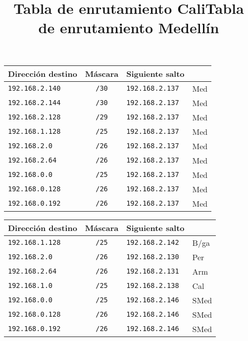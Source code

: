 \begin{table}[h]
\label{enrutamientoCal}
\begin{center}
\title{Tabla de enrutamiento Cali}
\begin{tabular}{lcll}
Dirección destino & Máscara & Siguiente salto &  \\ \hline
\verb=192.168.2.140= & \verb=/30= & \verb=192.168.2.137 = & Med \\
\verb=192.168.2.144= & \verb=/30= & \verb=192.168.2.137 = & Med \\
\verb=192.168.2.128= & \verb=/29= & \verb=192.168.2.137 = & Med \\
\verb=192.168.1.128= & \verb=/25= & \verb=192.168.2.137 = & Med \\
\verb=192.168.2.0= & \verb=/26= & \verb=192.168.2.137 = & Med \\
\verb=192.168.2.64= & \verb=/26= & \verb=192.168.2.137 = & Med \\
\verb=192.168.0.0= & \verb=/25= & \verb=192.168.2.137 = & Med \\
\verb=192.168.0.128= & \verb=/26= & \verb=192.168.2.137 = & Med \\
\verb=192.168.0.192= & \verb=/26= & \verb=192.168.2.137 = & Med \\
\end{tabular}
\end{center}
\end{table}%



\begin{table}[h]
\label{enrutamientoMed}
\begin{center}
\title{Tabla de enrutamiento Medellín}
\begin{tabular}{lcll}
Dirección destino & Máscara & Siguiente salto &  \\ \hline
\verb=192.168.1.128= & \verb=/25= & \verb=192.168.2.142 = & B/ga \\
\verb=192.168.2.0= & \verb=/26= & \verb=192.168.2.130 = & Per \\
\verb=192.168.2.64= & \verb=/26= & \verb=192.168.2.131 = & Arm \\
\verb=192.168.1.0= & \verb=/25= & \verb=192.168.2.138 = & Cal \\
\verb=192.168.0.0= & \verb=/25= & \verb=192.168.2.146 = & SMed \\
\verb=192.168.0.128= & \verb=/26= & \verb=192.168.2.146 = & SMed \\
\verb=192.168.0.192= & \verb=/26= & \verb=192.168.2.146 = & SMed \\
\end{tabular}
\end{center}
\end{table}%


